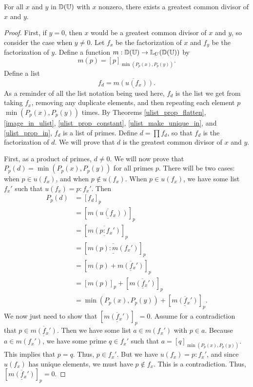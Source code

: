 \documentclass[../../math.tex]{subfiles}
\begin{document}
\begin{lemma} \label{ufd_gcd_ex_div}
    For all $x$ and $y$ in $\mathbb{D}(\mathbb{U})$ with $x$ nonzero, there exists a greatest
    common divisor of $x$ and $y$.
\end{lemma}
\begin{proof}
    First, if $y = 0$, then $x$ would be a greatest common divisor of $x$ and
    $y$, so consider the case when $y \neq 0$.  Let $f_x$ be the factorization
    of $x$ and $f_y$ be the factorization of $y$.  Define a function $m : \mathbb{D}(\mathbb{U})
    \to \mathbb{L}_U(\mathbb{D}(\mathbb{U}))$ by
    \[
        m(p) = [p]_{\min(P_p(x), P_p(y))}.
    \]
    Define a list
\newcommand{\flatten}[1]{\underline{\overline{#1}}}
    \[
        f_d = \flatten{m(u(f_x))}.
    \]
    As a reminder of all the list notation being used here, $f_d$ is the list we
    get from taking $f_x$, removing any duplicate elements, and then repeating
    each element $p$ $\min(P_p(x), P_p(y))$ times.  By Theorems
    \ref{ulist_prop_flatten}, \ref{image_in_ulist}, \ref{ulist_prop_constant},
    \ref{ulist_make_unique_in}, and \ref{ulist_prop_in}, $f_d$ is a list of
    primes.  Define $d = \prod f_d$, so that $f_d$ is the factorization of $d$.
    We will prove that $d$ is the greatest common divisor of $x$ and $y$.

    First, as a product of primes, $d \neq 0$.  We will now prove that $P_p(d) =
    \min(P_p(x), P_p(y))$ for all primes $p$.  There will be two cases: when $p
    \in u(f_x)$, and when $p \notin u(f_x)$.  When $p \in u(f_x)$, we have some
    list $f_x'$ such that $u(f_x) = p : f_x'$.  Then
    \begin{align*}
        P_p(d)
        &= [f_d]_p \\
        &= [\flatten{m(u(f_x))}]_p \\
        &= [\flatten{m(p : f_x')}]_p \\
        &= [\flatten{m(p) : m(f_x')}]_p \\
        &= [m(p) + \flatten{m(f_x')}]_p \\
        &= [m(p)]_p + [\flatten{m(f_x')}]_p \\
        &= \min(P_p(x), P_p(y)) + [\flatten{m(f_x')}]_p.
    \end{align*}
    We now just need to show that $[\flatten{m(f_x')}]_p = 0$.  Assume for a
    contradiction that $p \in \flatten{m(f_x')}$.  Then we have some list $a \in
    m(f_x')$ with $p \in a$.  Because $a \in m(f_x')$, we have some prime $q \in
    f_x'$ such that $a = [q]_{\min(P_p(x), P_p(y))}$.  This implies that $p =
    q$.  Thus, $p \in f_x'$.  But we have $u(f_x) = p : f_x'$, and since
    $u(f_x)$ has unique elements, we must have $p \notin f_x$.  This is a
    contradiction.  Thus, $[\flatten{m(f_x')}]_p = 0$.


\end{proof}
\end{document}
